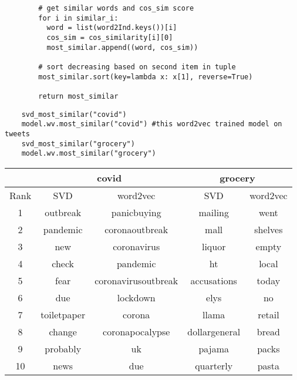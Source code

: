 \begin{enumerate}
\begin{lstlisting}
        # get similar words and cos_sim score
        for i in similar_i:
          word = list(word2Ind.keys())[i]
          cos_sim = cos_similarity[i][0]
          most_similar.append((word, cos_sim))

        # sort decreasing based on second item in tuple
        most_similar.sort(key=lambda x: x[1], reverse=True)

        return most_similar
  \end{lstlisting}
        \begin{lstlisting}
    svd_most_similar("covid")
    model.wv.most_similar("covid") #this word2vec trained model on tweets
    svd_most_similar("grocery")
    model.wv.most_similar("grocery")
  \end{lstlisting}
        \begin{center}
          \bgroup
          \def\arraystretch{1.5}%
          \captionsetup{type=figure}
          \begin{tabular}{|c|c c|c c|}
            \hline
            {}   & \multicolumn{2}{c|}{\textbf{covid}} & \multicolumn{2}{c|}{\textbf{grocery}}                            \\
            \hline
            Rank & SVD                                 & word2vec                              & SVD           & word2vec \\
            \hline
            {1}  & outbreak                            & panicbuying                           & mailing       & went     \\
            {2}  & pandemic                            & coronaoutbreak                        & mall          & shelves  \\
            {3}  & new                                 & coronavirus                           & liquor        & empty    \\
            {4}  & check                               & pandemic                              & ht            & local    \\
            {5}  & fear                                & coronavirusoutbreak                   & accusations   & today    \\
            {6}  & due                                 & lockdown                              & elys          & no       \\
            {7}  & toiletpaper                         & corona                                & llama         & retail   \\
            {8}  & change                              & coronapocalypse                       & dollargeneral & bread    \\
            {9}  & probably                            & uk                                    & pajama        & packs    \\
            {10} & news                                & due                                   & quarterly     & pasta    \\
            \hline
          \end{tabular}
          \egroup
        \end{center}
\end{enumerate}
